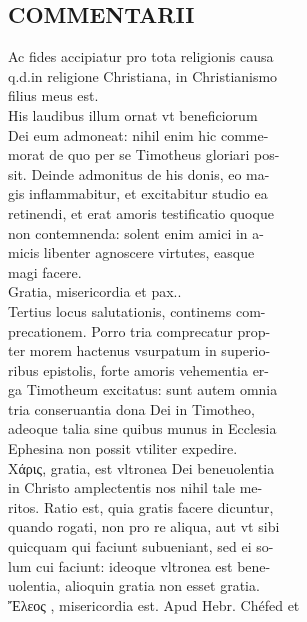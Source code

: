 \documentclass{article}
\begin{document}
\begin{pages}
\section*{COMMENTARII \\
                }Ac fides accipiatur pro tota religionis causa \\
                q.d.in religione Christiana, in Christianismo \\
                filius meus est. \\
                His laudibus illum ornat vt beneficiorum \\
                Dei eum admoneat: nihil enim hic comme- \\
                morat de quo per se Timotheus gloriari pos- \\
                sit. Deinde admonitus de his donis, eo ma- \\
                gis inflammabitur, et excitabitur studio ea \\
                retinendi, et erat amoris testificatio quoque \\
                non contemnenda: solent enim amici in a- \\
                micis libenter agnoscere virtutes, easque \\
                magi facere. \\
                Gratia, misericordia et pax.. \\
                Tertius locus salutationis, continems com- \\
                precationem. Porro tria comprecatur prop- \\
                ter morem hactenus vsurpatum in superio- \\
                ribus epistolis, forte amoris vehementia er- \\
                ga Timotheum excitatus: sunt autem omnia \\
                tria conseruantia dona Dei in Timotheo, \\
                adeoque talia sine quibus munus in Ecclesia \\
                Ephesina non possit vtiliter expedire. \\
                Xάρις, gratia, est vltronea Dei beneuolentia \\
                in Christo amplectentis nos nihil tale me- \\
                ritos. Ratio est, quia gratis facere dicuntur, \\
                quando rogati, non pro re aliqua, aut vt sibi \\
                quicquam qui faciunt subueniant, sed ei so- \\
                lum cui faciunt: ideoque vltronea est bene- \\
                uolentia, alioquin gratia non esset gratia. \\
                Ἔλεος , misericordia est. Apud Hebr. Chéfed et \\
                

\end{pages}
\end{document}
